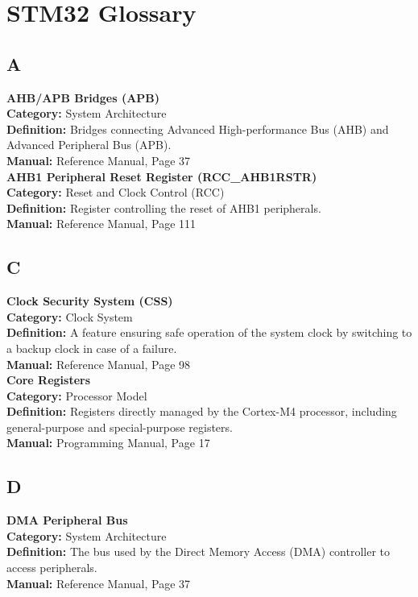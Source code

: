 \documentclass{article}
\begin{document}
\section*{STM32 Glossary}

\subsection*{A}
\textbf{AHB/APB Bridges (APB)} \\
\textbf{Category:} System Architecture \\
\textbf{Definition:} Bridges connecting Advanced High-performance Bus (AHB) and Advanced Peripheral Bus (APB). \\
\textbf{Manual:} Reference Manual, Page 37 \\

\textbf{AHB1 Peripheral Reset Register (RCC\_AHB1RSTR)} \\
\textbf{Category:} Reset and Clock Control (RCC) \\
\textbf{Definition:} Register controlling the reset of AHB1 peripherals. \\
\textbf{Manual:} Reference Manual, Page 111 \\

\subsection*{C}
\textbf{Clock Security System (CSS)} \\
\textbf{Category:} Clock System \\
\textbf{Definition:} A feature ensuring safe operation of the system clock by switching to a backup clock in case of a failure. \\
\textbf{Manual:} Reference Manual, Page 98 \\

\textbf{Core Registers} \\
\textbf{Category:} Processor Model \\
\textbf{Definition:} Registers directly managed by the Cortex-M4 processor, including general-purpose and special-purpose registers. \\
\textbf{Manual:} Programming Manual, Page 17 \\

\subsection*{D}
\textbf{DMA Peripheral Bus} \\
\textbf{Category:} System Architecture \\
\textbf{Definition:} The bus used by the Direct Memory Access (DMA) controller to access peripherals. \\
\textbf{Manual:} Reference Manual, Page 37 \\
\end{document}
